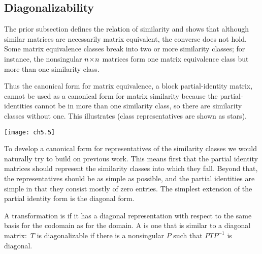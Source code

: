 \subsection{Diagonalizability}
The prior subsection defines the relation of similarity and shows that
although similar matrices are necessarily matrix equivalent, the converse
does not hold.
Some matrix equivalence classes break into two or more similarity 
classes; for instance, the nonsingular $n \! \times \! n$ matrices
form one matrix equivalence class but more than one similarity class.

Thus the canonical form for matrix equivalence, 
a block partial-identity matrix, cannot be used as a canonical form 
for matrix similarity because
the partial-identities cannot be in more than one
similarity class, so there are similarity classes without one.
This illustrates 
(class representatives are shown as stars).
\begin{center}
  \texttt{[image: ch5.5]}
\end{center}
To develop a canonical form for representatives of
the similarity classes
we would naturally try to build on previous work.
This means 
first that the partial identity matrices should represent the similarity
classes into which they fall. 
Beyond that, the representatives should be as simple as possible, and
the partial identities are simple in that they consist mostly of zero entries. 
The simplest extension of the partial identity form is the diagonal form.

\begin{definition}
A transformation is %
if it has a diagonal representation
with respect to the same basis for the codomain as for the domain.
A 
is one that is similar to a diagonal matrix:~\( T \) is diagonalizable
if there is a nonsingular \( P \) such that \( PTP^{-1} \) is diagonal.
\end{definition}

